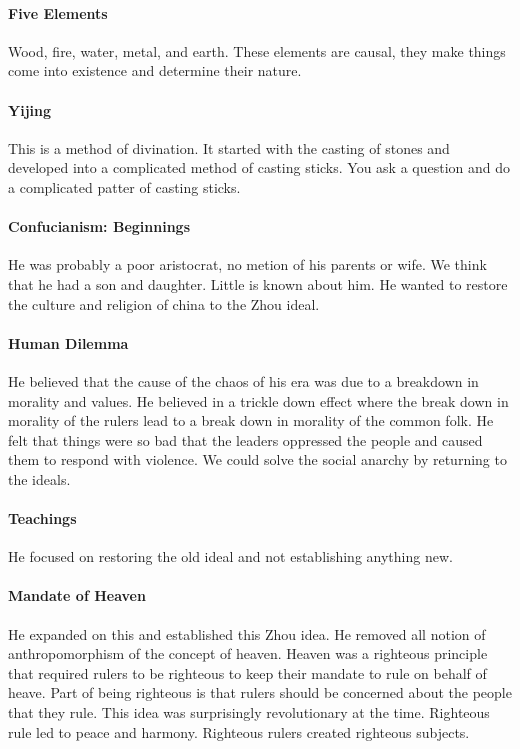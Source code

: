 \documentclass{article}
\begin{document}
\paragraph{Five Elements}
\label{par:five_elements}
Wood, fire, water, metal, and earth. These elements are causal, they make things come into existence and determine their nature.

\paragraph{Yijing}
\label{par:yijing}
This is a method of divination. It started with the casting of stones and developed into a complicated method of casting sticks. You ask a question and do a complicated patter of casting sticks.

\paragraph{Confucianism: Beginnings}
\label{par:confucianism_beginnings}
He was probably a poor aristocrat, no metion of his parents or wife. We think that he had a son and daughter. Little is known about him. He wanted to restore the culture and religion of china to the Zhou ideal.

\paragraph{Human Dilemma}
\label{par:human_dilemma}
He believed that the cause of the chaos of his era was due to a breakdown in morality and values. He believed in a trickle down effect where the break down in morality of the rulers lead to a break down in morality of the common folk. He felt that things were so bad that the leaders oppressed the people and caused them to respond with violence. We could solve the social anarchy by returning to the ideals.

\paragraph{Teachings}
\label{par:teachings}
He focused on restoring the old ideal and not establishing anything new.

\paragraph{Mandate of Heaven}
\label{par:mandate_of_heaven}
He expanded on this and established this Zhou idea. He removed all notion of anthropomorphism of the concept of heaven. Heaven was a righteous principle that required rulers to be righteous to keep their mandate to rule on behalf of heave. Part of being righteous is that rulers should be concerned about the people that they rule. This idea was surprisingly revolutionary at the time. Righteous rule led to peace and harmony. Righteous rulers created righteous subjects.
\end{document}
